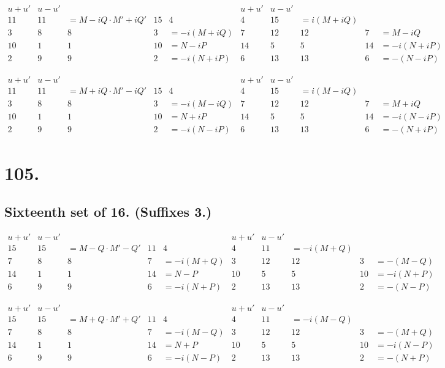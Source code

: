 \documentclass[11pt,a4paper]{article}
\begin{document}
\[
\begin{array}{c|cccc|c|cccc}
u+u' & u-u' & & & & u+u' & u-u' & & & \\
\hline
11 & 11 & = M-iQ \cdot M'+iQ' & 15 & 4 & 4 & 15 & = i(M+iQ) \\
3 & 8 & 8 & 3 & = -i(M+iQ) & 7 & 12 & 12 & 7 & = M-iQ \\
10 & 1 & 1 & 10 & = N-iP & 14 & 5 & 5 & 14 & = -i(N+iP) \\
2 & 9 & 9 & 2 & = -i(N+iP) & 6 & 13 & 13 & 6 & = -(N-iP)
\end{array}
\]

\[
\begin{array}{c|cccc|c|cccc}
u+u' & u-u' & & & & u+u' & u-u' & & & \\
\hline
11 & 11 & = M+iQ \cdot M'-iQ' & 15 & 4 & 4 & 15 & = i(M-iQ) \\
3 & 8 & 8 & 3 & = -i(M-iQ) & 7 & 12 & 12 & 7 & = M+iQ \\
10 & 1 & 1 & 10 & = N+iP & 14 & 5 & 5 & 14 & = -i(N-iP) \\
2 & 9 & 9 & 2 & = -i(N-iP) & 6 & 13 & 13 & 6 & = -(N+iP)
\end{array}
\]

\newpage
\section*{105.}
\label{sec:105}

\subsection*{Sixteenth set of 16. (Suffixes 3.)}

\[
\begin{array}{c|cccc|c|cccc}
u+u' & u-u' & & & & u+u' & u-u' & & & \\
\hline
15 & 15 & = M-Q \cdot M'-Q' & 11 & 4 & 4 & 11 & = -i(M+Q) \\
7 & 8 & 8 & 7 & = -i(M+Q) & 3 & 12 & 12 & 3 & = -(M-Q) \\
14 & 1 & 1 & 14 & = N-P & 10 & 5 & 5 & 10 & = -i(N+P) \\
6 & 9 & 9 & 6 & = -i(N+P) & 2 & 13 & 13 & 2 & = -(N-P)
\end{array}
\]

\[
\begin{array}{c|cccc|c|cccc}
u+u' & u-u' & & & & u+u' & u-u' & & & \\
\hline
15 & 15 & = M+Q \cdot M'+Q' & 11 & 4 & 4 & 11 & = -i(M-Q) \\
7 & 8 & 8 & 7 & = -i(M-Q) & 3 & 12 & 12 & 3 & = -(M+Q) \\
14 & 1 & 1 & 14 & = N+P & 10 & 5 & 5 & 10 & = -i(N-P) \\
6 & 9 & 9 & 6 & = -i(N-P) & 2 & 13 & 13 & 2 & = -(N+P)
\end{array}
\]
\end{document}
